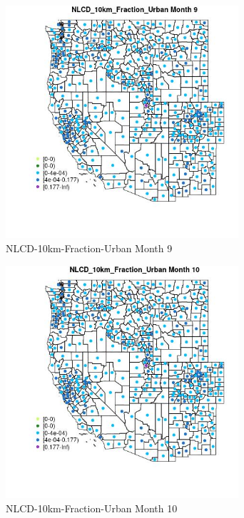 \begin{figure} 
\centering  
\includegraphics[width=0.77\textwidth]{Code_Outputs/df_report_ML_predictors_CountyCentroid_Locations_Dates_2008-01-01to2018-12-31_MapObsMo9NLCD_10km_Fraction_Urban.jpg} 
\caption{\label{fig:df_report_ML_predictors_CountyCentroid_Locations_Dates_2008-01-01to2018-12-31MapObsMo9NLCD_10km_Fraction_Urban}NLCD-10km-Fraction-Urban Month 9} 
\end{figure} 
 

\clearpage 

\begin{figure} 
\centering  
\includegraphics[width=0.77\textwidth]{Code_Outputs/df_report_ML_predictors_CountyCentroid_Locations_Dates_2008-01-01to2018-12-31_MapObsMo10NLCD_10km_Fraction_Urban.jpg} 
\caption{\label{fig:df_report_ML_predictors_CountyCentroid_Locations_Dates_2008-01-01to2018-12-31MapObsMo10NLCD_10km_Fraction_Urban}NLCD-10km-Fraction-Urban Month 10} 
\end{figure} 
 

